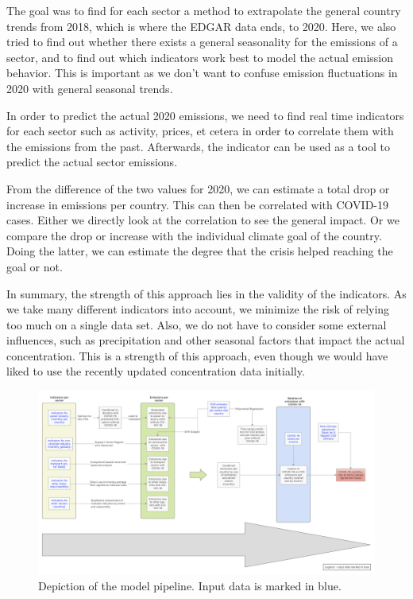The goal was to find for each sector a method to extrapolate the general country trends from 2018, which is where the EDGAR data ends, to 2020. Here, we also tried to find out whether there exists a general seasonality for the emissions of a sector, and to find out which indicators work best to model the actual emission behavior. This is important as we don't want to confuse emission fluctuations in 2020 with general seasonal trends.

In order to predict the actual 2020 emissions, we need to find real time indicators for each sector such as activity, prices, et cetera in order to correlate them with the emissions from the past. Afterwards, the indicator can be used as a tool to predict the actual sector emissions.

From the difference of the two values for 2020, we can estimate a total drop or increase in emissions per country. This can then be correlated with COVID-19 cases. Either we directly look at the correlation to see the general impact. Or we compare the drop or increase with the individual climate goal of the country. Doing the latter, we can estimate the degree that the crisis helped reaching the goal or not.

In summary, the strength of this approach lies in the validity of the indicators. As we take many different indicators into account, we minimize the risk of relying too much on a single data set.
Also, we do not have to consider some external influences, such as precipitation and other seasonal factors that impact the actual \co concentration. This is a strength of this approach, even though we would have liked to use the recently updated \co concentration data initially.



\begin{figure}[H]
	\centering
	\includegraphics[width=1.45\linewidth, angle=90]{img/mock-up_frontend_pipeline_description.pdf}
	\caption{Depiction of the model pipeline. Input data is marked in blue.}
	\label{fig:model_pipeline}
\end{figure}




